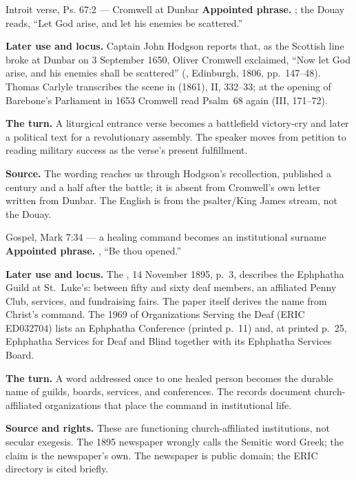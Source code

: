 \begin{afterlife}{Introit verse, Ps. 67:2 --- Cromwell at Dunbar}
\textbf{Appointed phrase.} ;
the Douay reads, ``Let God arise, and let his enemies be scattered.''

\textbf{Later use and locus.} Captain John Hodgson reports that, as the
Scottish line broke at Dunbar on 3 September 1650, Oliver Cromwell exclaimed,
``Now let God arise, and his enemies shall be scattered'' (, Edinburgh, 1806, pp.~147--48). Thomas Carlyle transcribes the scene
in  (1861), II, 332--33; at the
opening of Barebone's Parliament in 1653 Cromwell read Psalm~68 again (III,
171--72).

\textbf{The turn.} A liturgical entrance verse becomes a battlefield
victory-cry and later a political text for a revolutionary assembly. The
speaker moves from petition to reading military success as the verse's
present fulfillment.

\textbf{Source.} The wording reaches us through Hodgson's recollection,
published a century and a half after the battle; it is absent from Cromwell's
own letter written from Dunbar.
The English is from the psalter/King James stream, not the Douay.
\end{afterlife}

\begin{afterlife}{Gospel, Mark 7:34 --- a healing command becomes an institutional surname}
\textbf{Appointed phrase.} , ``Be thou opened.''

\textbf{Later use and locus.} The , 14 November 1895,
p.~3, describes the Ephphatha Guild at St.~Luke's: between fifty and sixty
deaf members, an affiliated Penny Club, services, and fundraising fairs. The
paper itself derives the name from Christ's command. The 1969  of Organizations Serving the Deaf (ERIC ED032704)
lists an Ephphatha Conference (printed p.~11) and, at printed p.~25,
Ephphatha Services for Deaf and Blind together with its Ephphatha Services
Board.

\textbf{The turn.} A word addressed once to one healed person becomes the
durable name of guilds, boards, services, and conferences. The records
document church-affiliated organizations that place the command in
institutional life.

\textbf{Source and rights.} These are functioning church-affiliated institutions, not
secular exegesis. The 1895 newspaper wrongly calls the Semitic word Greek;
the claim is the newspaper's own. The newspaper is
public domain; the ERIC directory is cited briefly.
\end{afterlife}

